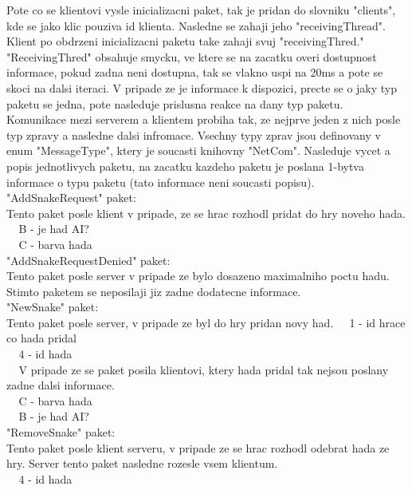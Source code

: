 \documentclass{article}
\newcommand{\s}{$~~~~~$}
\begin{document}
Pote co se klientovi vysle inicializacni paket, tak je pridan do slovniku "clients", kde se jako klic pouziva id klienta. Nasledne se zahaji jeho "receivingThread". Klient po obdrzeni inicializacni paketu take zahaji svuj "receivingThred." "ReceivingThred" obsahuje smycku, ve ktere se na zacatku overi dostupnost informace, pokud zadna neni dostupna, tak se vlakno uspi na 20ms a pote se skoci na dalsi iteraci. V pripade ze je informace k dispozici, precte se o jaky typ paketu se jedna, pote nasleduje prislusna reakce na dany typ paketu.\\

Komunikace mezi serverem a klientem probiha tak, ze nejprve jeden z nich posle typ zpravy a nasledne dalsi infromace. Vsechny typy zprav jsou definovany v enum "MessageType", ktery je soucasti knihovny "NetCom". Nasleduje vycet a popis jednotlivych paketu, na zacatku kazdeho paketu je poslana 1-bytva informace o typu paketu (tato informace neni soucasti popisu).\\

\noindent "AddSnakeRequest" paket:\\
Tento paket posle klient v pripade, ze se hrac rozhodl pridat do hry noveho hada.
\s B - je had AI?\\
\s C - barva hada\\

\noindent "AddSnakeRequestDenied" paket:\\
Tento paket posle server v pripade ze bylo dosazeno maximalniho poctu hadu. Stimto paketem se neposilaji jiz zadne dodatecne informace.\\

\noindent "NewSnake" paket:\\
Tento paket posle server, v pripade ze byl do hry pridan novy had.
\s 1 - id hrace co hada pridal\\
\s 4 - id hada\\
\s V pripade ze se paket posila klientovi, ktery hada pridal tak nejsou poslany zadne dalsi informace.\\
\s C - barva hada\\
\s B - je had AI?\\

\noindent "RemoveSnake" paket:\\
Tento paket posle klient serveru, v pripade ze se hrac rozhodl odebrat hada ze hry. Server tento paket nasledne rozesle vsem klientum.\\
\s 4 - id hada\\
\end{document}
